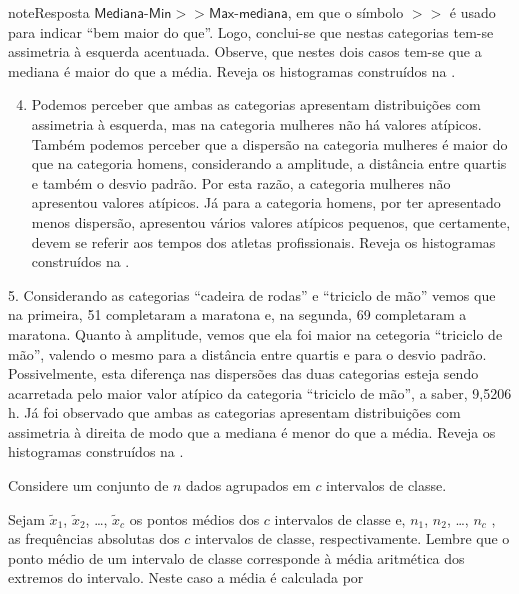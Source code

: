 \begin{sphinxadmonition}{note}{Resposta}
\(\textsf{Mediana-Min} >>\textsf{Max-mediana}\), em que o símbolo \(>>\) é usado para indicar “bem maior do que”.
Logo, conclui-se que nestas categorias tem-se assimetria à esquerda acentuada. Observe, que nestes dois casos tem-se que a mediana é maior do que a média. Reveja os histogramas construídos na .
\begin{enumerate}
\setcounter{enumi}{3}
\item {} 
Podemos perceber que ambas as categorias apresentam distribuições com assimetria à esquerda, mas na categoria mulheres não há valores atípicos. Também podemos perceber que a dispersão na categoria mulheres é maior do que na categoria homens, considerando a amplitude, a distância entre quartis e também o desvio padrão. Por esta razão, a categoria mulheres não apresentou valores atípicos. Já para a categoria homens, por ter apresentado menos dispersão, apresentou vários valores atípicos pequenos, que certamente, devem se referir aos tempos dos atletas profissionais. Reveja os histogramas construídos na .

\end{enumerate}

5. Considerando as categorias “cadeira de rodas” e “triciclo de mão” vemos que na primeira, 51 completaram a maratona e, na segunda, 69 completaram a maratona. Quanto à amplitude, vemos que ela foi maior na cetegoria “triciclo de mão”, valendo o mesmo para a distância entre quartis e para o desvio padrão. Possivelmente, esta diferença nas dispersões das duas categorias esteja sendo acarretada pelo maior valor atípico da categoria “triciclo de mão”, a saber, 9,5206 h. Já foi observado que ambas as categorias apresentam distribuições com assimetria à direita de modo que a mediana é menor do que a média.
Reveja os histogramas construídos na .
\end{sphinxadmonition}


\label{\detokenize{PE104-A:sec-para-saber-mais}}\label{\detokenize{PE104-A::doc}}\label{\detokenize{PE104-A:para-saber-mais}}



Considere um conjunto de \(n\) dados agrupados em \(c\) intervalos de classe.

Sejam \(\tilde{x}_{1}\), \(\tilde{x}_{2}\), …, \(\tilde{x}_{c}\) os pontos médios dos \(c\) intervalos de classe e, \(n_1\), \(n_2\), …, \(n_c\) ,  as frequências absolutas dos \(c\) intervalos de classe, respectivamente. Lembre que o ponto médio de um intervalo de classe  corresponde à média aritmética dos extremos do intervalo. Neste caso a média é calculada por

